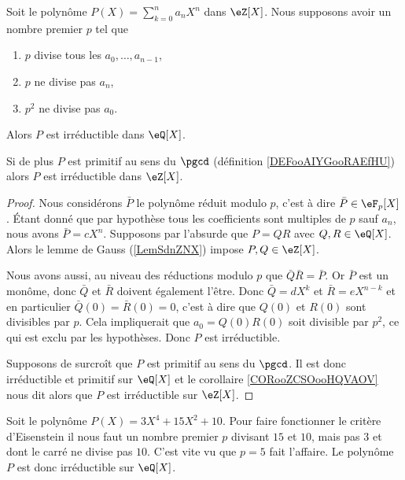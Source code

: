 \begin{proposition}
    Soit le polynôme \( P(X)=\sum_{k=0}^n a_nX^n\) dans \( \eZ[X]\). Nous supposons avoir un nombre premier \( p\) tel que
    \begin{enumerate}
        \item
            \( p\) divise tous les \( a_0,\ldots, a_{n-1}\),
        \item
            \( p\) ne divise pas \( a_n\),
        \item
            \( p^2\) ne divise pas \( a_0\).
    \end{enumerate}
    Alors \( P\) est irréductible dans \( \eQ[X]\).

    Si de plus \( P\) est primitif au sens du \( \pgcd\) (définition \ref{DEFooAIYGooRAEfHU}) alors \( P\) est irréductible dans \( \eZ[X]\).
\end{proposition}

\begin{proof}
    Nous considérons \( \bar P\) le polynôme réduit modulo \( p\), c'est à dire \( \bar P\in \eF_p[X]\). Étant donné que par hypothèse tous les coefficients sont multiples de \( p\) sauf \( a_n\), nous avons \( \bar P=cX^n\). Supposons par l'absurde que \( P=QR\) avec \( Q,R\in \eQ[X]\). Alors le lemme de Gauss (\ref{LemSdnZNX}) impose \( P,Q\in \eZ[X]\).

    Nous avons aussi, au niveau des réductions modulo \( p\) que $\bar Q\bar R=\bar P$. Or \( \bar P\) est un monôme, donc \( \bar Q\) et \( \bar R\) doivent également l'être. Donc \( \bar Q=dX^k\) et \( \bar R=eX^{n-k}\) et en particulier \( \bar Q(0)=\bar R(0)=0\), c'est à dire que \( Q(0)\) et \( R(0)\) sont divisibles par \( p\). Cela impliquerait que \( a_0=Q(0)R(0)\) soit divisible par \( p^2\), ce qui est exclu par les hypothèses. Donc \( P\) est irréductible.

    Supposons de surcroît que \( P\) est primitif au sens du \( \pgcd\). Il est donc irréductible et primitif sur \( \eQ[X]\) et le corollaire \ref{CORooZCSOooHQVAOV} nous dit alors que \( P\) est irréductible sur \( \eZ[X]\).
\end{proof}

\begin{example}
    Soit le polynôme \( P(X)=3X^4+15 X^2+10\). Pour faire fonctionner le critère d'Eisenstein il nous faut un nombre premier \( p\) divisant \( 15\) et \( 10\), mais pas \( 3\) et dont le carré ne divise pas \( 10\). C'est vite vu que \( p=5\) fait l'affaire. Le polynôme \( P\) est donc irréductible sur \( \eQ[X]\).
\end{example}


